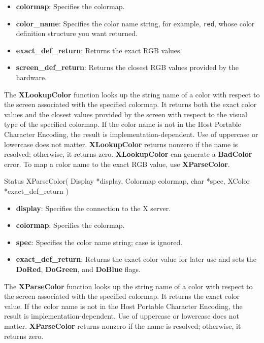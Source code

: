 \documentclass{report}
\begin{document}
\begin{itemize}
\begin{itemize}
                \item \textbf{colormap}: Specifies the colormap.
                \item \textbf{color\_name}: Specifies the color name string, for example, \texttt{red}, whose color definition structure you want returned.
                \item \textbf{exact\_def\_return}: Returns the exact RGB values.
                \item \textbf{screen\_def\_return}: Returns the closest RGB values provided by the hardware.
            \end{itemize}
            \bigbreak \noindent
            The \textbf{XLookupColor} function looks up the string name of a color with respect to the screen associated with the specified colormap. It returns both the exact color values and the closest values provided by the screen with respect to the visual type of the specified colormap. If the color name is not in the Host Portable Character Encoding, the result is implementation-dependent. Use of uppercase or lowercase does not matter. \textbf{XLookupColor} returns nonzero if the name is resolved; otherwise, it returns zero.
            \bigbreak \noindent
            \textbf{XLookupColor} can generate a \textbf{BadColor} error.
            \bigbreak \noindent
            To map a color name to the exact RGB value, use \textbf{XParseColor}.
            \bigbreak \noindent
            \begin{cppcode}
                Status XParseColor(
                    Display *display,
                    Colormap colormap,
                    char *spec,
                    XColor *exact_def_return
                )
            \end{cppcode}
            \begin{itemize}
                \item \textbf{display}: Specifies the connection to the X server.
                \item \textbf{colormap}: Specifies the colormap.
                \item \textbf{spec}: Specifies the color name string; case is ignored.
                \item \textbf{exact\_def\_return}: Returns the exact color value for later use and sets the \textbf{DoRed}, \textbf{DoGreen}, and \textbf{DoBlue} flags.
            \end{itemize}
            \bigbreak \noindent
            The \textbf{XParseColor} function looks up the string name of a color with respect to the screen associated with the specified colormap. It returns the exact color value. If the color name is not in the Host Portable Character Encoding, the result is implementation-dependent. Use of uppercase or lowercase does not matter. \textbf{XParseColor} returns nonzero if the name is resolved; otherwise, it returns zero.

\end{itemize}
\end{document}
